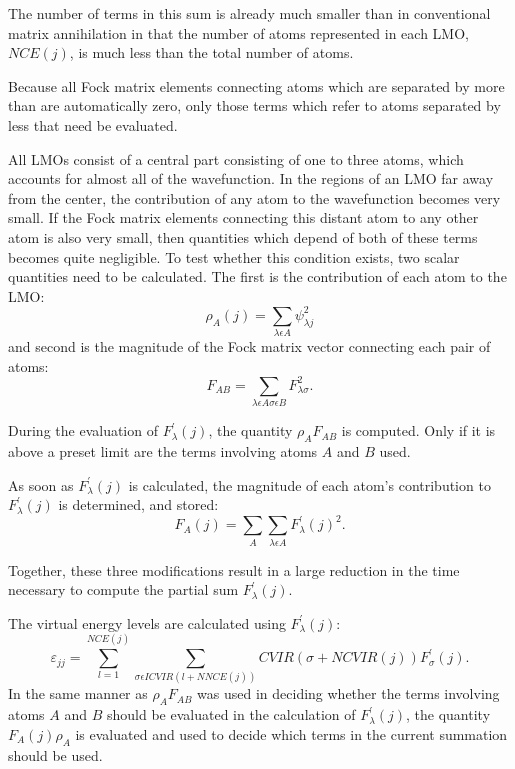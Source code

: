 The number of terms in this sum is already much smaller than in conventional
matrix annihilation in that the number of atoms represented in each LMO, 
$NCE(j)$, is much less than the total number of atoms.

Because all Fock matrix elements connecting atoms which are separated by  more
than  are automatically zero, only those terms which refer to
atoms separated by less that  need be evaluated.

All LMOs consist of a central part consisting of one to three atoms, which 
accounts for almost all of the wavefunction.  In the regions of an LMO far away
from the center, the contribution of any atom to the wavefunction becomes very
small.  If the Fock matrix elements connecting this distant atom to any other
atom is also very small, then quantities which depend of both of these terms
becomes quite negligible.    To test whether this condition exists, two scalar
quantities need to be calculated.  The first is the contribution of each atom
to the LMO:
\begin{equation}
\rho_A(j) =\sum_{\lambda\epsilon A}\psi_{\lambda j}^2
\end{equation}
and second is the magnitude  of the Fock matrix vector connecting each pair of
atoms:
\begin{equation}
F_{A B} = \sum_{\lambda\epsilon A \sigma\epsilon B}F_{\lambda \sigma}^2.
\end{equation}

During the evaluation of  $F_{\lambda}^{'}(j)$, the quantity $\rho_AF_{A B}$ is
computed. Only if it is above a preset limit are the terms involving atoms $A$
and $B$ used.  

As soon as $F_{\lambda}^{'}(j)$ is calculated, the magnitude of each atom's
contribution to $F_{\lambda}^{'}(j)$ is determined, and stored:
\begin{equation}
F_A(j)=\sum_A\sum_{\lambda\epsilon A}F_{\lambda}^{'}(j)^2.
\end{equation}

Together, these three modifications result in a large reduction in the time
necessary to compute the partial sum $F_{\lambda}^{'}(j)$.

The virtual energy levels are calculated using $F_{\lambda}^{'}(j)$:
\begin{equation}
\varepsilon_{jj}= \sum_{l=1}^{NCE(j)}\sum_{\sigma \epsilon ICVIR(l+NNCE(j))}
CVIR(\sigma +NCVIR(j))F_{\sigma}^{'}(j).
\end{equation}
In the same manner as $\rho_AF_{A B}$ was used in deciding whether the terms
involving atoms $A$ and $B$ should be evaluated in the calculation of 
$F_{\lambda}^{'}(j)$,  the quantity $F_A(j)\rho_A$ is evaluated and used to
decide which terms in the current summation should be used.

